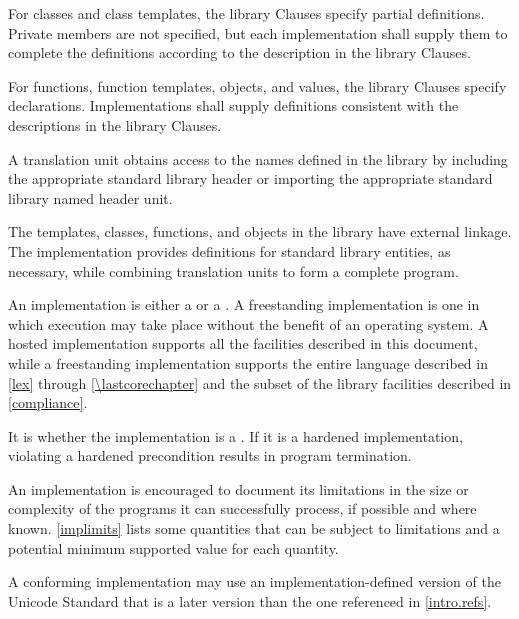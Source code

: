 \pnum
{}%
%
%
For classes and class templates, the library Clauses specify partial
definitions. Private members are not
specified, but each implementation shall supply them to complete the
definitions according to the description in the library Clauses.

\pnum
For functions, function templates, objects, and values, the library
Clauses specify declarations. Implementations shall supply definitions
consistent with the descriptions in the library Clauses.

\pnum
A \Cpp{}  translation unit
obtains access to the names defined in the library by
including the appropriate standard library header or importing
the appropriate standard library named header unit.

\pnum
The templates, classes, functions, and objects in the library have
external linkage. The implementation provides
definitions for standard library entities, as necessary, while combining
translation units to form a complete \Cpp{}  program.%

\pnum
An implementation is either a
 or a
.
A freestanding
implementation is one in which execution may take place without the benefit of
an operating system.
A hosted implementation
supports all the facilities described in this document, while
a freestanding implementation
supports the entire \Cpp{} language
described in \ref{lex} through \ref{\lastcorechapter} and
the subset of the library facilities described in \ref{compliance}.

\pnum
It is
whether the implementation is a
.
If it is a hardened implementation,
violating a hardened precondition
results in program termination.

\pnum
\recommended
An implementation is encouraged to document its limitations in
the size or complexity of the programs it can successfully process,
if possible and where known.
\ref{implimits} lists some quantities that can be subject to limitations and
a potential minimum supported value for each quantity.

\pnum
A conforming implementation may use an implementation-defined version
of the Unicode Standard that is a later version than the one
referenced in \ref{intro.refs}.

